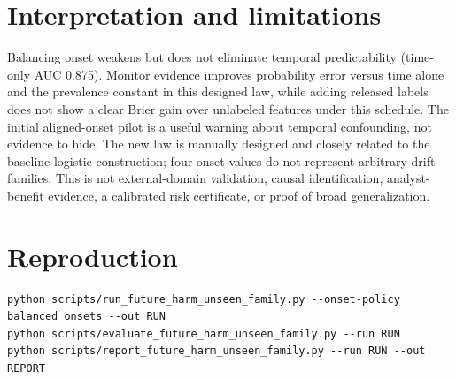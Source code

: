 \documentclass[10pt,a4paper]{article}
\begin{document}
\section{Interpretation and limitations}
Balancing onset weakens but does not eliminate temporal predictability (time-only AUC 0.875). Monitor evidence improves probability error versus time alone and the prevalence constant in this designed law, while adding released labels does not show a clear Brier gain over unlabeled features under this schedule. The initial aligned-onset pilot is a useful warning about temporal confounding, not evidence to hide. The new law is manually designed and closely related to the baseline logistic construction; four onset values do not represent arbitrary drift families. This is not external-domain validation, causal identification, analyst-benefit evidence, a calibrated risk certificate, or proof of broad generalization.
\section{Reproduction}
\begin{verbatim}
python scripts/run_future_harm_unseen_family.py --onset-policy balanced_onsets --out RUN
python scripts/evaluate_future_harm_unseen_family.py --run RUN
python scripts/report_future_harm_unseen_family.py --run RUN --out REPORT
\end{verbatim}
\end{document}
